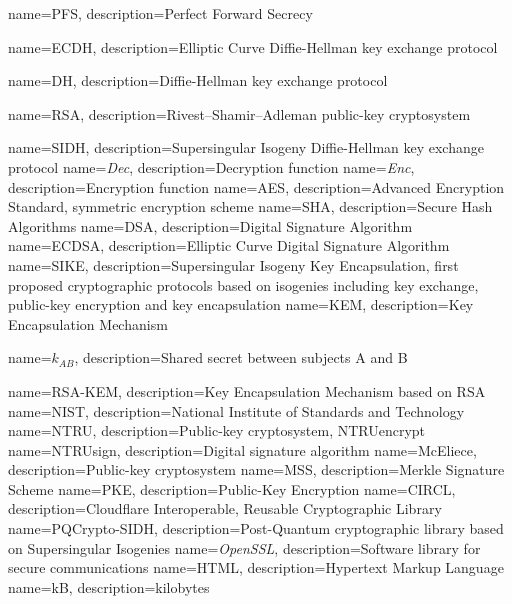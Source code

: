 
{
    name=PFS,
    description={Perfect Forward Secrecy}
}

{
    name=ECDH,
    description={Elliptic Curve Diffie-Hellman key exchange protocol}
}

{
    name=DH,
    description={Diffie-Hellman key exchange protocol}
}

{
    name=RSA,
    description={Rivest–Shamir–Adleman public-key cryptosystem}
}

{
    name=SIDH,
    description={Supersingular Isogeny Diffie-Hellman key exchange protocol}
}
{
    name=\textit{Dec},
    description={Decryption function}
}
{
    name=\textit{Enc},
    description={Encryption function}
}
{
    name=AES,
    description={Advanced Encryption Standard, symmetric encryption scheme}
}
{
    name=SHA,
    description={Secure Hash Algorithms}
}
{
    name=DSA,
    description={Digital Signature Algorithm}
}
{
    name=ECDSA,
    description={Elliptic Curve Digital Signature Algorithm}
}
{
    name=SIKE,
    description={Supersingular Isogeny Key Encapsulation, first proposed cryptographic protocols based on isogenies including key exchange, public-key encryption and key encapsulation}
}
{
    name=KEM,
    description={Key Encapsulation Mechanism}
}

{
    name=$k_{AB}$,
    description={Shared secret between subjects A and B}
}

{
    name=RSA-KEM,
    description={Key Encapsulation Mechanism based on RSA}
}
{
    name=NIST,
    description={National Institute of Standards and Technology}
}
{
    name=NTRU,
    description={Public-key cryptosystem, NTRUencrypt}
}
{
    name=NTRUsign,
    description={Digital signature algorithm}
}
{
    name=McEliece,
    description={Public-key cryptosystem}
}
{
    name=MSS,
    description={Merkle Signature Scheme}
}
{
    name=PKE,
    description={Public-Key Encryption}
}
{
    name=CIRCL,
    description={Cloudflare Interoperable, Reusable Cryptographic Library}
}
{
    name=PQCrypto-SIDH,
    description={Post-Quantum cryptographic library based on Supersingular Isogenies}
}
{
    name=\textit{OpenSSL},
    description={Software library for secure communications}
}
{
    name=HTML,
    description={Hypertext Markup Language}
}
{
    name=kB,
    description={kilobytes}
}